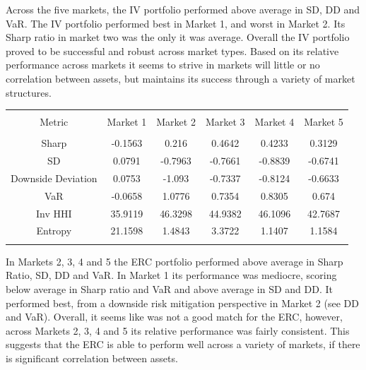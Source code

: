 \documentclass[11pt,preprint, authoryear]{elsarticle}
\let\origtable\table
\let\endorigtable\endtable
\renewenvironment{table}[1][2] {
    \expandafter\origtable\expandafter[H]
} {
    \endorigtable
}
\numberwithin{equation}{section}
\numberwithin{figure}{section}
\numberwithin{table}{section}
\begin{document}
Across the five markets, the IV portfolio performed above average in SD,
DD and VaR. The IV portfolio performed best in Market 1, and worst in
Market 2. Its Sharp ratio in market two was the only it was average.
Overall the IV portfolio proved to be successful and robust across
market types. Based on its relative performance across markets it seems
to strive in markets will little or no correlation between assets, but
maintains its success through a variety of market structures.

\begin{table}[!htbp] \centering 
  \caption{Equal Risk Contribution} 
  \label{erc} 
\begin{tabular}{@{\extracolsep{5pt}} cccccc} 
\\[-1.8ex]\hline 
\hline \\[-1.8ex] 
Metric & Market 1 & Market 2 & Market 3 & Market 4 & Market 5 \\ 
\hline \\[-1.8ex] 
Sharp & -0.1563 & 0.216 & 0.4642 & 0.4233 & 0.3129 \\ 
SD & 0.0791 & -0.7963 & -0.7661 & -0.8839 & -0.6741 \\ 
Downside Deviation & 0.0753 & -1.093 & -0.7337 & -0.8124 & -0.6633 \\ 
VaR & -0.0658 & 1.0776 & 0.7354 & 0.8305 & 0.674 \\ 
Inv HHI & 35.9119 & 46.3298 & 44.9382 & 46.1096 & 42.7687 \\ 
Entropy & 21.1598 & 1.4843 & 3.3722 & 1.1407 & 1.1584 \\ 
\hline \\[-1.8ex] 
\end{tabular} 
\end{table}

In Markets 2, 3, 4 and 5 the ERC portfolio performed above average in
Sharp Ratio, SD, DD and VaR. In Market 1 its performance was mediocre,
scoring below average in Sharp ratio and VaR and above average in SD and
DD. It performed best, from a downside risk mitigation perspective in
Market 2 (see DD and VaR). Overall, it seems like was not a good match
for the ERC, however, across Markets 2, 3, 4 and 5 its relative
performance was fairly consistent. This suggests that the ERC is able to
perform well across a variety of markets, if there is significant
correlation between assets.
\end{document}
